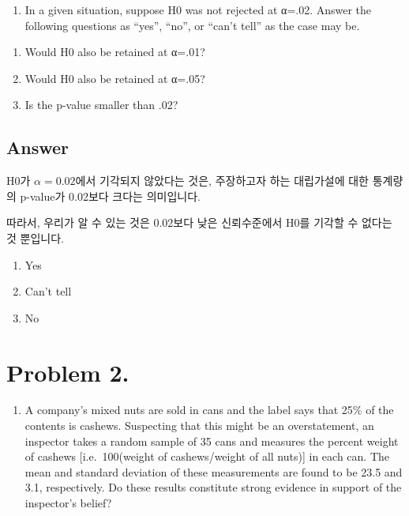 \documentclass[
  a4paper,
  DIV=11,
  numbers=noendperiod]{scrreprt}
\providecommand{\tightlist}{%
  \setlength{\itemsep}{0pt}\setlength{\parskip}{0pt}}\usepackage{longtable,booktabs,array}
\begin{document}

\begin{enumerate}
\def\labelenumi{\arabic{enumi}.}
\tightlist
\item
  In a given situation, suppose H0 was not rejected at α=.02. Answer the
  following questions as ``yes'', ``no'', or ``can't tell'' as the case
  may be.
\end{enumerate}

\begin{enumerate}
\def\labelenumi{(\alph{enumi})}
\tightlist
\item
  Would H0 also be retained at α=.01?
\item
  Would H0 also be retained at α=.05?
\item
  Is the p-value smaller than .02?
\end{enumerate}

\subsection*{Answer}\label{answer-26}

H0가 \(\alpha=0.02\)에서 기각되지 않았다는 것은, 주장하고자 하는
대립가설에 대한 통계량의 p-value가 0.02보다 크다는 의미입니다.

따라서, 우리가 알 수 있는 것은 0.02보다 낮은 신뢰수준에서 H0를 기각할 수
없다는 것 뿐입니다.

\begin{enumerate}
\def\labelenumi{(\alph{enumi})}
\tightlist
\item
  Yes
\item
  Can't tell
\item
  No
\end{enumerate}

\section*{Problem 2.}\label{problem-2.-2}


\begin{enumerate}
\def\labelenumi{\arabic{enumi}.}
\setcounter{enumi}{1}
\tightlist
\item
  A company's mixed nuts are sold in cans and the label says that 25\%
  of the contents is cashews. Suspecting that this might be an
  overstatement, an inspector takes a random sample of 35 cans and
  measures the percent weight of cashews {[}i.e.~100(weight of
  cashews/weight of all nuts){]} in each can. The mean and standard
  deviation of these measurements are found to be 23.5 and 3.1,
  respectively. Do these results constitute strong evidence in support
  of the inspector's belief?
\end{enumerate}
\end{document}
